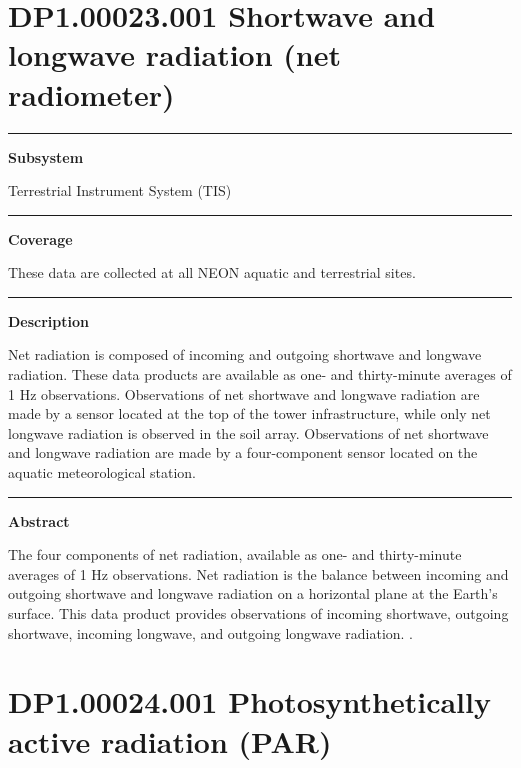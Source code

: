 \documentclass[]{article}
\begin{document}
\section{DP1.00023.001 Shortwave and longwave radiation (net
radiometer)}\label{dp1.00023.001-shortwave-and-longwave-radiation-net-radiometer}

\begin{center}\rule{0.5\linewidth}{\linethickness}\end{center}

\textbf{Subsystem}

Terrestrial Instrument System (TIS)

\begin{center}\rule{0.5\linewidth}{\linethickness}\end{center}

\textbf{Coverage}

These data are collected at all NEON aquatic and terrestrial sites.

\begin{center}\rule{0.5\linewidth}{\linethickness}\end{center}

\textbf{Description}

Net radiation is composed of incoming and outgoing shortwave and
longwave radiation. These data products are available as one- and
thirty-minute averages of 1 Hz observations. Observations of net
shortwave and longwave radiation are made by a sensor located at the top
of the tower infrastructure, while only net longwave radiation is
observed in the soil array. Observations of net shortwave and longwave
radiation are made by a four-component sensor located on the aquatic
meteorological station.

\begin{center}\rule{0.5\linewidth}{\linethickness}\end{center}

\textbf{Abstract}

The four components of net radiation, available as one- and
thirty-minute averages of 1 Hz observations. Net radiation is the
balance between incoming and outgoing shortwave and longwave radiation
on a horizontal plane at the Earth's surface. This data product provides
observations of incoming shortwave, outgoing shortwave, incoming
longwave, and outgoing longwave radiation. \newpage
.

\section{DP1.00024.001 Photosynthetically active radiation
(PAR)}\label{dp1.00024.001-photosynthetically-active-radiation-par}
\end{document}
